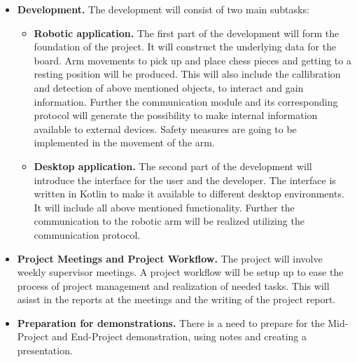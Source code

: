 \documentclass[11pt,fleqn,twoside]{article}
\begin{document}
\begin{itemize}
    \item \textbf{Development.} The development will consist of two main subtasks:
          \begin{itemize}
            \item \textbf{Robotic application.} The first part of the development will form the foundation of the 
                         project. It will construct the underlying data for the board. Arm movements to pick up and 
                         place chess pieces and getting to a resting position will be produced. This will also 
                         include the callibration and detection of above mentioned objects, to interact and gain 
                         information. Further the communication module and its corresponding protocol will generate 
                         the possibility to make internal information available to external devices. Safety measures 
                         are going to be implemented in the movement of the arm.
                         
            \item  \textbf{Desktop application.} The second part of the development will introduce the interface for 
                          the user and the developer. The interface is written in Kotlin to make it available to 
                          different desktop environments. It will include all above mentioned functionality. 
                          Further the communication to the robotic arm will be realized utilizing the communication 
                          protocol.
          \end{itemize}
    
    \item \textbf{Project Meetings and Project Workflow.} The project will involve weekly supervisor meetings. A 
                  project workflow will be setup up to ease the process of project management and realization of 
                  needed tasks. This will asisst in the reports at the meetings and the writing of the project 
                  report.

    \item \textbf{Preparation for demonstrations.} There is a need to prepare for the Mid-Project and End-Project 
                  demonstration, using notes and creating a presentation.
                  
\end{itemize}


\end{document}
